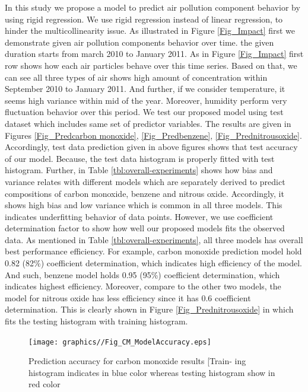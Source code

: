 In this study we propose a model to 
predict air pollution component behavior by using rigid regression. 
We use rigid regression instead of linear regression,
to hinder the multicollinearity issue. 
As illustrated in Figure \ref{Fig_Impact} first we 
demonstrate given air pollution components behavior over time.
the given duration starts from march 2010 to January 2011.
As in Figure \ref{Fig_Impact} first row shows how each 
air particles behave over this time series. 
Based on that, we can see all three types of air shows 
high amount of concentration within September 2010 to January 2011.
And further, if we consider temperature, it seems high variance within mid of the year.
Moreover, humidity perform very fluctuation behavior over this period.
We test our proposed model using test dataset which 
includes same set of predictor variables.
The results are given in Figures \ref{Fig_Predcarbon monoxide}, \ref{Fig_Predbenzene}, \ref{Fig_Prednitrousoxide}.
Accordingly, test data prediction given in above 
figures shows that test accuracy of our model. 
Because, the test data histogram is properly fitted with test histogram.
Further, in Table \ref{tbl:overall-experiments} shows how bias and variance relates with 
different models which are separately derived to 
predict compositions of carbon monoxide, benzene and nitrous oxide.
Accordingly, it shows high bias and low variance which is common in all three models.
This indicates underfitting behavior of data points.
However, we use coefficient determination factor to 
show how well our proposed models fits the observed data. 
As mentioned in Table \ref{tbl:overall-experiments}, 
all three models has overall best performance efficiency. 
For example, carbon monoxide prediction model hold 0.82 (82\%) coefficient determination, which indicates high efficiency of the model.
And such, benzene model holds 0.95 (95\%) coefficient determination, which indicates highest efficiency.
Moreover, compare to the other two models, the model for nitrous oxide has less efficiency since it has 0.6 coefficient determination. 
This is clearly shown in Figure \ref{Fig_Prednitrousoxide} in which fits the testing histogram with training histogram.

\begin{figure}
  \centering
 \texttt{[image: graphics//Fig\_CM\_ModelAccuracy.eps]}
  \caption{Prediction accuracy for carbon monoxide results [Train-
  ing histogram indicates in blue color whereas testing histogram
  show in red color} \label{Fig_CM_ModelAccuracy}
\end{figure}

